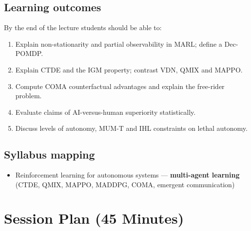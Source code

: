 \documentclass[11pt]{article}
\begin{document}
\subsection*{Learning outcomes}By the end of the lecture students should be able to:\begin{enumerate}\item Explain non-stationarity and partial observability in MARL; define a Dec-POMDP.\item Explain CTDE and the IGM property; contrast VDN, QMIX and MAPPO.\item Compute COMA counterfactual advantages and explain the free-rider problem.\item Evaluate claims of AI-versus-human superiority statistically.\item Discuss levels of autonomy, MUM-T and IHL constraints on lethal autonomy.\end{enumerate}

\subsection*{Syllabus mapping}\begin{itemize}\item Reinforcement learning for autonomous systems --- \textbf{multi-agent learning} (CTDE, QMIX, MAPPO, MADDPG, COMA, emergent communication)\end{itemize}

\section{Session Plan (45 Minutes)}
\end{document}
